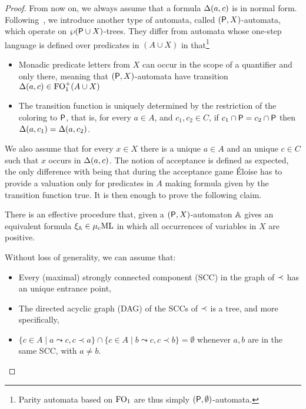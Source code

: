 \begin{proof}
From now on, we always assume that a formula $\Delta(a,c)$ is in normal form. 
Following~\cite{Ven08}, we introduce another type of automata, called $(\mathsf{P},X)$-automata, which operate on $\wp{(\mathsf{P}\cup X)}$-trees.
They differ from automata whose one-step language is defined over predicates in $(A \cup X)$ in that\footnote{Parity automata based on $\mathrm{FO}_1$ are thus simply $(\mathsf{P},\emptyset)$-automata.}
\begin{itemize}
\item Monadic predicate letters from $X$ can occur in the scope of a %
quantifier and only there, meaning that $(\mathsf{P},X)$-automata have transition $\Delta(a,c) \in \mathrm{FO}_1^+(A\cup X)$
%
\item The transition function is uniquely determined by the restriction of the coloring to $\mathsf{P}$, that is, for every $a \in A$, and $c_1, c_2 \in C$, if $c_1 \cap \mathsf{P} = c_2 \cap \mathsf{P}$ then $\Delta(a, c_1)= \Delta(a, c_2)$.
\end{itemize}
We also assume that
for every $x \in X$ there is a unique $a \in A$ and an unique $c \in C$ such that $x$ occurs in $\Delta(a,c)$.
The notion of acceptance is defined as expected, the only difference with being that during the acceptance game \'Eloise has to provide a valuation only for predicates in $A$ making formula given by the transition function true. %
It is then enough to prove the following claim.
\begin{claimfirst}\label{c:1}
There is an effective procedure that, given a $(\mathsf{P},X)$-automaton $\mathbb{A}$ gives an equivalent  formula $\xi_{\mathbb{A}} \in \mu_{c}\mathrm{ML}$ in which all occurrences of variables in $X$ are positive.
\end{claimfirst}
\begin{pfclaim} %
Without loss of generality, we can assume that:
\begin{itemize}
 pt
\item Every (maximal) strongly connected component (SCC) in the graph of $\prec$ has an unique entrance point,
\item The directed acyclic graph (DAG) of the SCCs of $\prec$ is a tree, and more specifically,
\item %
$\{c \in A \mid a \leadsto c, c \prec a\}  \cap \{c \in A \mid b \leadsto c, c \prec b\}  = \emptyset$ whenever $a,b$ are in the same SCC, with $a\neq b$.
\end{itemize}


\end{pfclaim}
\end{proof}
